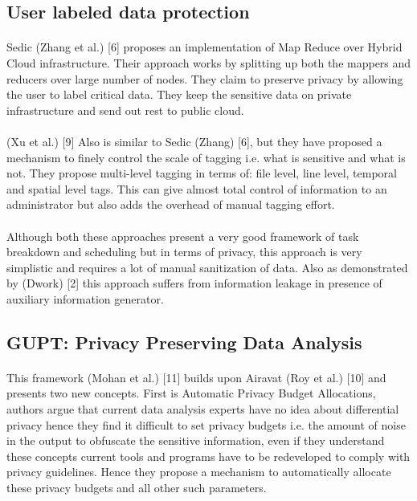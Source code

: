 \documentclass{report}
\begin{document}
\subsection{User labeled data protection}
\paragraph{}
Sedic (Zhang et al.) [6] proposes an implementation of Map Reduce over Hybrid Cloud infrastructure. Their approach works by splitting up both the mappers and reducers over large number of nodes. They claim to preserve privacy by allowing the user to label critical data. They keep the sensitive data on private infrastructure and send out rest to public cloud.
\paragraph{}
(Xu et al.) [9] Also is similar to Sedic (Zhang) [6], but they have proposed a mechanism to finely control the scale of tagging i.e. what is sensitive and what is not. They propose multi-level tagging in terms of: file level, line level, temporal and spatial level tags. This can give almost total control of information to an administrator but also adds the overhead of manual tagging effort.
\paragraph{}
Although both these approaches present a very good framework of task breakdown and scheduling but in terms of privacy, this approach is very simplistic and requires a lot of manual sanitization of data. Also as demonstrated by (Dwork) [2] this approach suffers from information leakage in presence of auxiliary information generator.
\subsection{GUPT: Privacy Preserving Data Analysis}
\paragraph{}
This framework (Mohan et al.) [11] builds upon Airavat (Roy et al.) [10] and presents two new concepts. First is Automatic Privacy Budget Allocations, authors argue that current data analysis experts have no idea about differential privacy hence they find it difficult to set privacy budgets i.e. the amount of noise in the output to obfuscate the sensitive information, even if they understand these concepts current tools and programs have to be redeveloped to comply with privacy guidelines. Hence they propose a mechanism to automatically allocate these privacy budgets and all other such parameters.
\end{document}
